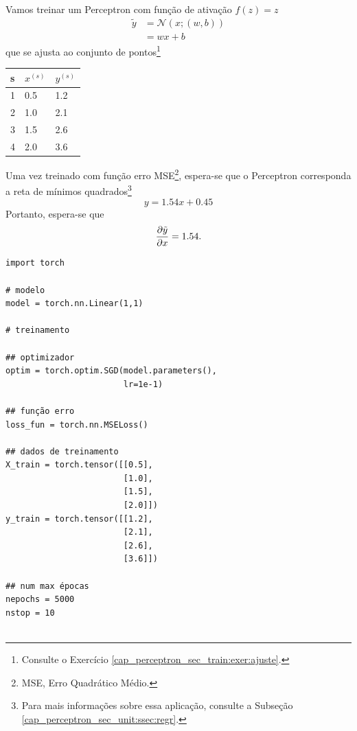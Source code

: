 \begin{ex}
  Vamos treinar um Perceptron com função de ativação $f(z) = z$
  \begin{subequations}
    \begin{align}
      \tilde{y} &= \mathcal{N}(x; (w,b))\\
                &= wx + b
    \end{align}
  \end{subequations}
  que se ajusta ao conjunto de pontos\footnote{Consulte o Exercício \ref{cap_perceptron_sec_train:exer:ajuste}.}
  \begin{center}
    \begin{tabular}{l|ll}
      s & $x^{(s)}$ & $y^{(s)}$\\\hline
      1 & 0.5 & 1.2\\
      2 & 1.0 & 2.1\\
      3 & 1.5 & 2.6\\
      4 & 2.0 & 3.6\\\hline
    \end{tabular}
  \end{center}
  Uma vez treinado com função erro MSE\footnote{MSE, Erro Quadrático Médio.}, espera-se que o Perceptron corresponda a reta de mínimos quadrados\footnote{Para mais informações sobre essa aplicação, consulte a Subseção \ref{cap_perceptron_sec_unit:ssec:regr}.}
  \begin{equation}
    y = 1.54x + 0.45
  \end{equation}
  Portanto, espera-se que
  \begin{equation}
    \frac{\partial \tilde{y}}{\partial x} = 1.54.
  \end{equation}

\begin{lstlisting}[caption=autograd\_percep.py]
import torch

# modelo
model = torch.nn.Linear(1,1)

# treinamento

## optimizador
optim = torch.optim.SGD(model.parameters(),
                        lr=1e-1)

## função erro
loss_fun = torch.nn.MSELoss()

## dados de treinamento
X_train = torch.tensor([[0.5],
                        [1.0],
                        [1.5],
                        [2.0]])
y_train = torch.tensor([[1.2],
                        [2.1],
                        [2.6],
                        [3.6]])

## num max épocas
nepochs = 5000
nstop = 10


\end{lstlisting}
\end{ex}
